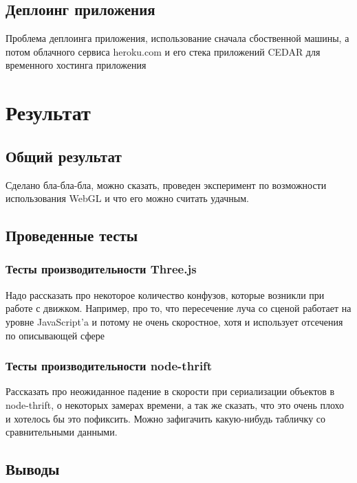 \documentclass[12pt, a4paper]{article}
\let\stdsection\section
\renewcommand\section{\newpage\stdsection}
\begin{document}
\subsection{Деплоинг приложения}
Проблема деплоинга приложения, использование сначала сбоственной машины, а потом
облачного сервиса heroku.com и его стека приложений CEDAR для временного
хостинга приложения


\section{Результат}
\subsection{Общий результат}
Сделано бла-бла-бла, можно сказать, проведен эксперимент по возможности
использования WebGL и что его можно считать удачным.
\subsection{Проведенные тесты}
\subsubsection{Тесты производительности Three.js}
Надо рассказать про некоторое количество конфузов, которые возникли при работе
с движком. Например, про то, что пересечение луча со сценой работает на уровне
JavaScript'a и потому не очень скоростное, хотя и использует отсечения по
описывающей сфере
\subsubsection{Тесты производительности node-thrift}
Рассказать про неожиданное падение в скорости при сериализации объектов в
node-thrift, о некоторых замерах времени, а так же сказать, что это очень плохо
и хотелось бы это пофиксить. Можно зафигачить какую-нибудь табличку со
сравнительными данными.
\subsection{Выводы}
\end{document}
